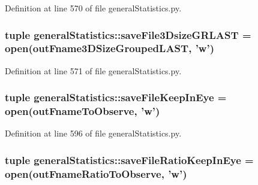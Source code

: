 \-Definition at line 570 of file general\-Statistics.\-py.

\hypertarget{namespacegeneral_statistics_a7dff4431bede759c68f27cb8b8ca3030}{
\subsubsection[{save\-File3\-Dsize\-G\-R\-L\-A\-S\-T}]{\setlength{\rightskip}{0pt plus 5cm}tuple {\bf general\-Statistics\-::save\-File3\-Dsize\-G\-R\-L\-A\-S\-T} = open({\bf out\-Fname3\-D\-Size\-Grouped\-L\-A\-S\-T}, 'w')}}\label{namespacegeneral_statistics_a7dff4431bede759c68f27cb8b8ca3030}


\-Definition at line 571 of file general\-Statistics.\-py.

\hypertarget{namespacegeneral_statistics_acdda9c45b9c93c48ec480c6aeb1a5f57}{
\subsubsection[{save\-File\-Keep\-In\-Eye}]{\setlength{\rightskip}{0pt plus 5cm}tuple {\bf general\-Statistics\-::save\-File\-Keep\-In\-Eye} = open({\bf out\-Fname\-To\-Observe}, 'w')}}\label{namespacegeneral_statistics_acdda9c45b9c93c48ec480c6aeb1a5f57}


\-Definition at line 596 of file general\-Statistics.\-py.

\hypertarget{namespacegeneral_statistics_ad9c5a196f37842caca2ecf19f8f1c6db}{
\subsubsection[{save\-File\-Ratio\-Keep\-In\-Eye}]{\setlength{\rightskip}{0pt plus 5cm}tuple {\bf general\-Statistics\-::save\-File\-Ratio\-Keep\-In\-Eye} = open({\bf out\-Fname\-Ratio\-To\-Observe}, 'w')}}\label{namespacegeneral_statistics_ad9c5a196f37842caca2ecf19f8f1c6db}


